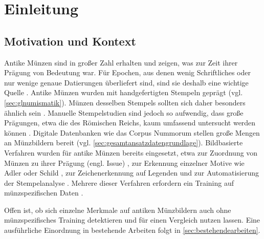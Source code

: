 
\chapter{Einleitung}\label{ch:introduction}
\glsresetall %

\section{Motivation und Kontext}
\label{sec:firstsection}
Antike Münzen sind in großer Zahl erhalten und zeigen, was zur Zeit ihrer Prägung von Bedeutung war. Für Epochen, aus denen wenig Schriftliches oder nur wenige genaue Datierungen überliefert sind, sind sie deshalb eine wichtige Quelle \cite{howgego1995ancient}.
Antike Münzen wurden mit handgefertigten Stempeln geprägt (vgl. \cref{sec:glnumismatik}). Münzen desselben Stempels sollten sich daher besonders ähnlich sein \cite{wikipedia-numismatik}. Manuelle Stempelstudien sind jedoch so aufwendig, dass große Prägungen, etwa die des Römischen Reichs, kaum umfassend untersucht werden können \cite{heinecke2021unsupervised}. Digitale Datenbanken wie das Corpus Nummorum \cite{peter2024corpus} stellen große Mengen an Münzbildern bereit (vgl. \cref{sec:gesamtansatzdatengrundlage}). Bildbasierte Verfahren wurden für antike Münzen bereits eingesetzt, etwa zur Zuordnung von Münzen zu ihrer Prägung (engl. Issue) \cite{guo2023siamese}, zur Erkennung einzelner Motive wie Adler oder Schild \cite{cooper2020learning}, zur Zeichenerkennung auf Legenden \cite{anwar2026reading} und zur Automatisierung der Stempelanalyse \cite{heinecke2021unsupervised}. Mehrere dieser Verfahren erfordern ein Training auf münzspezifischen Daten \cite{guo2023siamese,cooper2020learning,anwar2026reading}.

Offen ist, ob sich einzelne Merkmale auf antiken Münzbildern auch ohne münzspezifisches Training detektieren und für einen Vergleich nutzen lassen. Eine ausführliche Einordnung in bestehende Arbeiten folgt in \cref{sec:bestehendearbeiten}.

